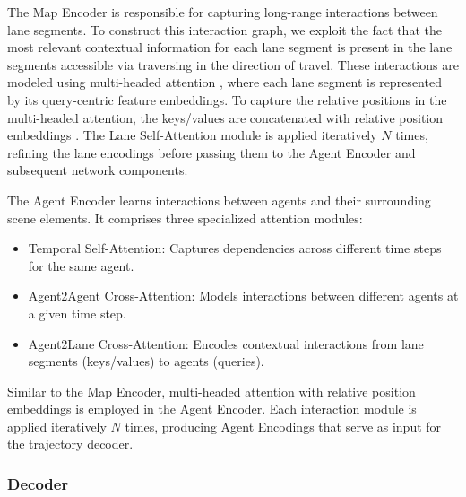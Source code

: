 The Map Encoder is responsible for capturing long-range interactions between lane segments. To construct this interaction graph, we exploit the fact that the most relevant contextual information for each lane segment is present in the lane segments accessible via traversing in the direction of travel. These interactions are modeled using multi-headed attention \cite{vaswani2017attention}, where each lane segment is represented by its query-centric feature embeddings. To capture the relative positions in the multi-headed attention, the keys/values are concatenated with relative position embeddings \cite{zhou2023query}. The Lane Self-Attention module is applied iteratively $N$ times, refining the lane encodings before passing them to the Agent Encoder and subsequent network components.

The Agent Encoder learns interactions between agents and their surrounding scene elements. It comprises three specialized attention modules:
\begin{itemize}
    \item Temporal Self-Attention: Captures dependencies across different time steps for the same agent.
    \item Agent2Agent Cross-Attention: Models interactions between different agents at a given time step.
    \item Agent2Lane Cross-Attention: Encodes contextual interactions from lane segments (keys/values) to agents (queries).
\end{itemize}
Similar to the Map Encoder, multi-headed attention with relative position embeddings is employed in the Agent Encoder. Each interaction module is applied iteratively $N$ times, producing Agent Encodings that serve as input for the trajectory decoder.

\subsubsection{Decoder}\label{subsubsection:decoder}

